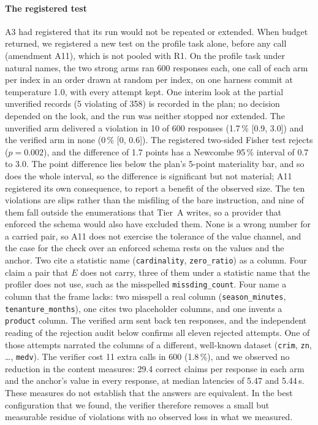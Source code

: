 \documentclass[10pt,twocolumn]{article}
\begin{document}
\paragraph{The registered test}
A3 had registered that its run would not be repeated or extended. When budget
returned, we registered a new test on the profile task alone, before any call
(amendment A11), which is not pooled with R1. On the profile task under natural
names, the two strong arms ran 600 responses each, one call of each arm per
index in an order drawn at random per index, on one harness commit at
temperature 1.0, with every attempt kept. One interim look at the partial
unverified records (5 violating of 358) is recorded in the plan; no decision
depended on the look, and the run was neither stopped nor extended. The unverified arm delivered a violation in 10 of 600
responses (1.7\,\% [0.9, 3.0]) and the verified arm in none (0\,\% [0, 0.6]).
The registered two-sided Fisher test rejects ($p=0.002$), and the difference
of 1.7 points has a Newcombe 95\,\% interval of 0.7 to 3.0. The point
difference lies below the plan's 5-point materiality bar, and so does the whole
interval, so the difference is significant but not material; A11 registered its own consequence, to report a benefit of the
observed size. The ten violations are slips rather than the misfiling of the
bare instruction, and nine of them fall outside the enumerations that Tier~A
writes, so a provider that enforced the schema would also have excluded them.
None is a wrong number for a carried pair, so A11 does not exercise the
tolerance of the value channel, and the case for the check over an enforced
schema rests on the values and the anchor. Two cite a
statistic name (\texttt{cardinality}, \texttt{zero\_ratio}) as a column. Four
claim a pair that $E$ does not carry, three of them under a statistic name that
the profiler does not use, such as the misspelled \texttt{missding\_count}.
Four name a column that the frame lacks: two misspell a real column
(\texttt{season\_minutes}, \texttt{tenanture\_months}), one cites two
placeholder columns, and one invents a \texttt{product} column. The verified
arm sent back
ten responses, and the independent reading of the rejection audit below
confirms all eleven rejected attempts. One of those attempts narrated the
columns of a different, well-known dataset (\texttt{crim}, \texttt{zn},
\ldots, \texttt{medv}). The verifier cost 11 extra calls in 600 (1.8\,\%), and
we observed no reduction in the content measures: 29.4 correct claims per
response in each arm and the anchor's value in every response, at median
latencies of 5.47 and 5.44\,s. These measures do not establish that the
answers are equivalent. In the best configuration that we found, the verifier
therefore removes a small but measurable residue of violations with no
observed loss in what we measured.
\end{document}
